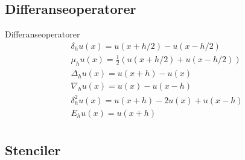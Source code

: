\subsection{Differanseoperatorer}
\begin{definition}{Differanseoperatorer}{}
    \begin{align*}
        \delta_h u(x) = u(x + h/2) - u(x - h/2) \tag{Sentral differanseoperator} \label{eq:central_diff}                           \\
        \mu_h u(x) = \frac{1}{2} \left( u(x + h/2) + u(x - h/2) \right) \tag{Gjennomsnittsoperator} \label{eq:avg_op}              \\
        \Delta_h u(x) = u(x + h) - u(x) \tag{Fremover differanseoperator} \label{eq:forward_diff}                                  \\
        \nabla_h u(x) = u(x) - u(x - h) \tag{Bakover differanseoperator} \label{eq:backward_diff}                                  \\
        \delta_h^2 u(x) = u(x + h) - 2u(x) + u(x - h) \tag{Andre ordens sentral differanseoperator} \label{eq:second_central_diff} \\
        E_h u(x) = u(x + h) \tag{Flytt operator} \label{eq:shift_op}                                                               \\
    \end{align*}
\end{definition}


\subsection*{Stenciler}

